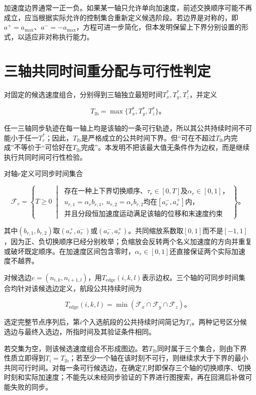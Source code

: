 \documentclass[UTF8,a4paper,12pt,fontset=fandol]{ctexart}
\begin{document}
加速度边界通常一正一负。如果某一轴只允许单向加速度，前述交换顺序可能不再成立，应当根据实际允许的控制集合重新定义候选阶段。若边界是对称的，即\(a^+=a_{\max}\)、\(a^-=-a_{\max}\)，方程可进一步简化，但本发明保留上下界分别设置的形式，以适应非对称执行能力。

\section{三轴共同时间重分配与可行性判定}

对固定的候选速度组合，分别得到三轴独立最短时间\(T_x^*,T_y^*,T_z^*\)，并定义

\[
T_{\mathrm{lb}}=\max\{T_x^*,T_y^*,T_z^*\}\text{。}
\]

任一三轴同步轨迹在每一轴上均是该轴的一条可行轨迹，所以其公共持续时间不可能小于任一\(T_r^*\)；因此，\(T_{\mathrm{lb}}\)是严格成立的公共时间下界。但“可在不超过\(T_{\mathrm{lb}}\)内完成”不等价于“可恰好在\(T_{\mathrm{lb}}\)完成”。本发明不把该最大值无条件作为边权，而是继续执行共同时间可行性检验。

对轴\(r\)定义可同步时间集合

\[
\mathcal F_r=\left\{T\ge0\;\middle|\;
\begin{array}{l}
\text{存在一种上下界切换顺序、}\tau_r\in[0,T]\text{及}\alpha_r\in[0,1]\text{，}\\
u_{r,1}=\alpha_r b_{r,1},\ u_{r,2}=\alpha_r b_{r,2}\text{均在}[a_r^-,a_r^+]\text{内，}\\
\text{并且分段恒加速度运动满足该轴的位移和末速度约束}
\end{array}
\right\}\text{。}
\]

其中\((b_{r,1},b_{r,2})\)取\((a_r^+,a_r^-)\)或\((a_r^-,a_r^+)\)。共同缩放系数取\([0,1]\)而不是\([-1,1]\)，因为正、负切换顺序已经分别枚举；负缩放会反转两个名义加速度的方向并重复或破坏既定顺序。在加速度区间包含零时，\(\alpha_r\in[0,1]\)还直接保证两个实际加速度不越界。

对候选边\(e=(n_{i,k},n_{i+1,l})\)，用\(T_{\mathrm{edge}}(i,k,l)\)表示边权。三个轴的可同步时间集合均针对该候选边定义，航段公共持续时间为

\[
T_{\mathrm{edge}}(i,k,l)=\min\left(\mathcal F_x\cap\mathcal F_y\cap\mathcal F_z\right)\text{。}
\]

选定完整节点序列后，第\(i\)个入选航段的公共持续时间简记为\(T_i\)。两种记号区分候选边与最终入选边，所指时间及其验证条件相同。

若交集为空，则该候选速度组合不形成图边。若\(T_{\mathrm{lb}}\)同时属于三个集合，则由下界性质立即得到\(T_i=T_{\mathrm{lb}}\)；若至少一个轴在该时刻不可行，则继续求大于下界的最小共同可行时间。对每一条可行候选边，在确定\(T_i\)时即保存三个轴的切换顺序、切换时刻和实际加速度；不能先以未经同步验证的下界进行图搜索，再在回溯后补做可能失败的同步。
\end{document}
